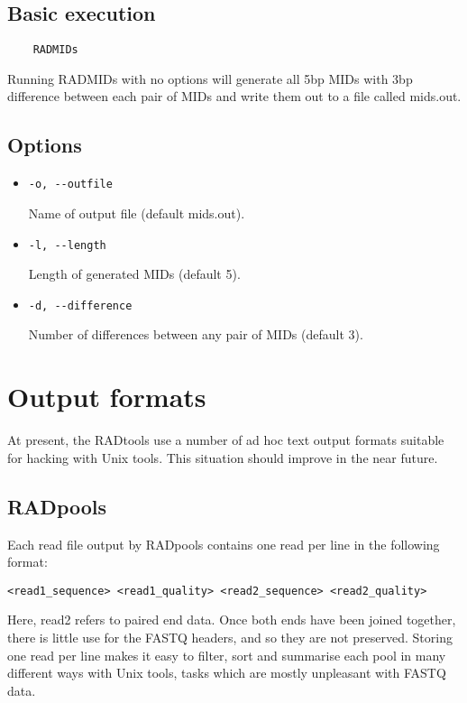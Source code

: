 \documentclass[a4paper]{article}
\begin{document}
\subsection{Basic execution}

\begin{verbatim}
    RADMIDs
\end{verbatim}

Running RADMIDs with no options will generate all 5bp MIDs with 3bp difference between each pair of MIDs and write them out to a file called mids.out.

\subsection{Options}

\begin{itemize}
    \item \verb|-o, --outfile|
    
    Name of output file (default mids.out).
    
    \item \verb|-l, --length|
    
    Length of generated MIDs (default 5).
    
    \item \verb|-d, --difference|
    
    Number of differences between any pair of MIDs (default 3).
\end{itemize}


\section{Output formats}

At present, the RADtools use a number of ad hoc text output formats suitable for hacking with Unix tools. This situation should improve in the near future.

\subsection{RADpools}

Each read file output by RADpools contains one read per line in the following format:

\begin{verbatim}
<read1_sequence> <read1_quality> <read2_sequence> <read2_quality>
\end{verbatim}

Here, read2 refers to paired end data. Once both ends have been joined together, there is little use for the FASTQ headers, and so they are not preserved. Storing one read per line makes it easy to filter, sort and summarise each pool in many different ways with Unix tools, tasks which are mostly unpleasant with FASTQ data.
\end{document}
